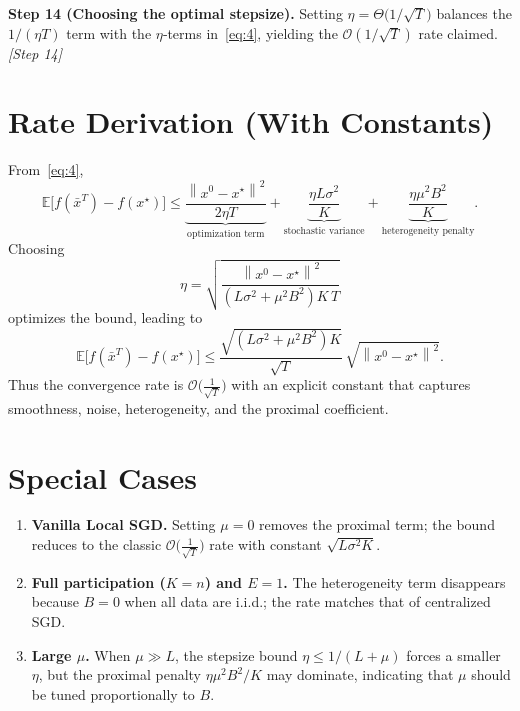 \documentclass[11pt]{article}
\newcommand{\E}{\mathbb{E}}
\newcommand{\norm}[1]{\left\lVert #1\right\rVert}
\begin{document}
\noindent\textbf{Step 14 (Choosing the optimal stepsize).}  
Setting $\eta = \Theta\!\big(1/\sqrt{T}\big)$ balances the $1/(\eta T)$ term with the $\eta$‑terms in~\eqref{eq:4}, yielding the $\mathcal{O}(1/\sqrt{T})$ rate claimed.
\hfill\textit{[Step 14]}

\section*{Rate Derivation (With Constants)}
From~\eqref{eq:4},
\[
\E\!\big[f(\bar x^{T})-f(x^{\star})\big]
\le \underbrace{\frac{\norm{x^{0}-x^{\star}}^{2}}{2\eta T}}_{\text{optimization term}}
+ \underbrace{\frac{\eta L\sigma^{2}}{K}}_{\text{stochastic variance}}
+ \underbrace{\frac{\eta\mu^{2}B^{2}}{K}}_{\text{heterogeneity penalty}}.
\]
Choosing
\[
\eta = \sqrt{\frac{\norm{x^{0}-x^{\star}}^{2}}{(L\sigma^{2}+\mu^{2}B^{2})K\,T}}
\]
optimizes the bound, leading to
\[
\E\!\big[f(\bar x^{T})-f(x^{\star})\big]
\le
\frac{\sqrt{(L\sigma^{2}+\mu^{2}B^{2})K}}{\sqrt{T}}\,
\sqrt{\norm{x^{0}-x^{\star}}^{2}}.
\tag{24}
\]
Thus the convergence rate is $\mathcal{O}\!\big(\tfrac{1}{\sqrt{T}}\big)$ with an explicit constant that captures smoothness, noise, heterogeneity, and the proximal coefficient.

\section*{Special Cases}
\begin{enumerate}[leftmargin=*]
\item \textbf{Vanilla Local SGD.} Setting $\mu=0$ removes the proximal term; the bound reduces to the classic $\mathcal{O}\!\big(\tfrac{1}{\sqrt{T}}\big)$ rate with constant $\sqrt{L\sigma^{2}K}$.
\item \textbf{Full participation ($K=n$) and $E=1$.} The heterogeneity term disappears because $B=0$ when all data are i.i.d.; the rate matches that of centralized SGD.
\item \textbf{Large $\mu$.} When $\mu\gg L$, the stepsize bound $\eta\le 1/(L+\mu)$ forces a smaller $\eta$, but the proximal penalty $\eta\mu^{2}B^{2}/K$ may dominate, indicating that $\mu$ should be tuned proportionally to $B$.
\end{enumerate}
\end{document}
